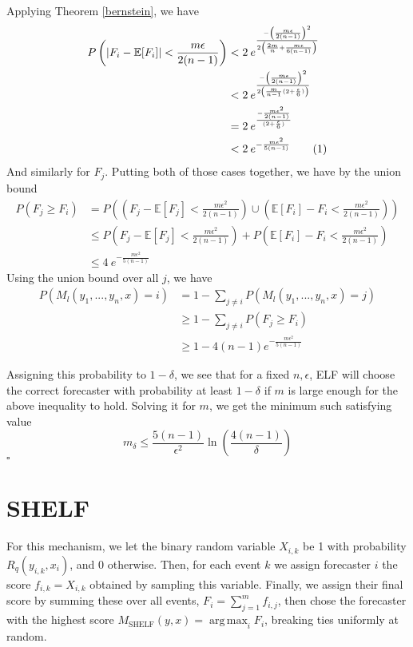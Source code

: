 \documentclass[letterpaper,12pt]{article}
\DeclareMathOperator*{\argmax}{arg\,max}
\newcommand{\E}{\mathbb{E}}
\newcommand{\1}{\mathbbm{1}}
\newcommand*{\QED}{\hfill\ensuremath{\square}}%
\newcommand\numberthis{\addtocounter{equation}{1}\tag{\theequation}}
\begin{document}
Applying Theorem \ref{bernstein}, we have
\begin{align*}
    P\left(\left| F_i - \E[F_i]\right| < \frac{m \epsilon}{2(n - 1)} \right) 
    &< 2 \: e^{\frac{-\left(\frac{m \epsilon}{2(n - 1)}\right)^2 }{2\left(\frac{2m}{n} + \frac{m \epsilon}{6(n - 1)}\right)}} \\
    &< 2 \: e^{\frac{-\left(\frac{m \epsilon}{2(n - 1)}\right)^2 }{2\left(\frac{m}{n-1}(2 + \frac{\epsilon}{6}) \right)}} \\
    &= 2 \: e^{\frac{-\frac{m \epsilon^2}{2(n - 1)} }{(2 + \frac{\epsilon}{6})}} \\
    &< 2 \: e^{-\frac{m \epsilon^2}{5(n - 1)} }  \numberthis \label{elf_bernstein} 
\end{align*}
And similarly for $F_j$. Putting both of those cases together, we have by the union bound
\begin{align*}
  P(F_j \geq F_i) &= P\left(\left(F_j - \E[F_j] < \frac{m \epsilon^2}{2(n - 1)}\right) \cup \left(\E[F_i] - F_i < \frac{m \epsilon^2}{2(n - 1)} \right) \right) \\
  &\leq P\left(F_j - \E[F_j] < \frac{m \epsilon^2}{2(n - 1)}\right) + P\left(\E[F_i] - F_i < \frac{m \epsilon^2}{2(n - 1)} \right) \\
  &\leq 4 \: e^{-\frac{m \epsilon^2}{5(n - 1)} }
\end{align*}
Using the union bound over all $j$, we have
\begin{align*}
  P\left(M_l(y_1, ..., y_n, x) = i\right)
  &= 1 - \sum_{j\neq i} P\left(M_l(y_1, ..., y_n, x) = j\right) \\
  &\geq 1 - \sum_{j\neq i} P\left(F_j \geq F_i\right) \\
  &\geq 1 - 4 (n-1) e^{-\frac{m \epsilon^2}{5(n - 1)}} 
\end{align*}

Assigning this probability to $1 - \delta$, we see that for a fixed $n, \epsilon$, ELF will choose the correct forecaster with probability at least $1 - \delta$ if $m$ is large enough for the above inequality to hold. Solving it for $m$, we get the minimum such satisfying value
\[m_\delta \leq \frac{5(n-1)}{\epsilon^2}\ln\left(\frac{4(n-1)}{\delta}\right) \]
\hfill\QED

\section{SHELF}
\newcommand{\shelf}{M_{\mathrm{SHELF}}}

For this mechanism, we let the binary random variable $X_{i, k}$ be 1 with probability $R_q(y_{i, k}, x_i)$, and 0 otherwise. Then, for each event $k$ we assign forecaster $i$ the score $f_{i, k} = X_{i, k}$ obtained by sampling this variable. Finally, we assign their final score by summing these over all events, $F_i = \sum_{j=1}^m f_{i, j}$, then chose the forecaster with the highest score $\shelf(y, x) = \argmax_i F_i$, breaking ties uniformly at random. 
\end{document}
